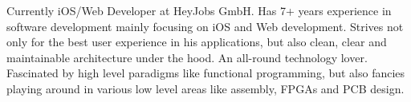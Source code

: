 

\begin{cvparagraph}
Currently iOS/Web Developer at HeyJobs GmbH. Has 7+ years experience in software development mainly focusing on iOS and Web development. Strives not only for the best user experience in his applications, but also clean, clear and maintainable architecture under the hood. An all-round technology lover. Fascinated by high level paradigms like functional programming, but also fancies playing around in various low level areas like assembly, FPGAs and PCB design.
\end{cvparagraph}
